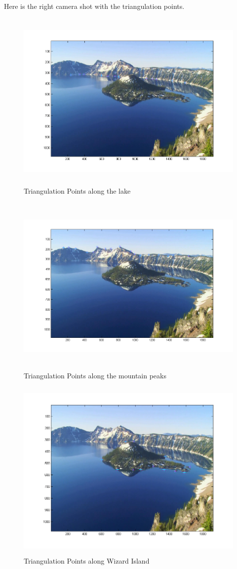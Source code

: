\documentclass[11pt,psfig]{article}
\begin{document}
Here is the right camera shot with the triangulation points.
\begin{figure}[H]
\centering
\includegraphics[height=3.5in]{sfmResults1/photoRight_lakeRidgePoints.png}
\caption{Triangulation Points along the lake}
\end{figure}
\begin{figure}[H]
\centering
\includegraphics[height=3.5in]{sfmResults1/photoRight_topRidgePoints.png}
\caption{Triangulation Points along the mountain peaks}
\end{figure}
\begin{figure}[H]
\centering
\includegraphics[height=3.5in]{sfmResults1/photoRight_wizardIslandPoints.png}
\caption{Triangulation Points along Wizard Island}
\end{figure}
\newpage
\end{document}
